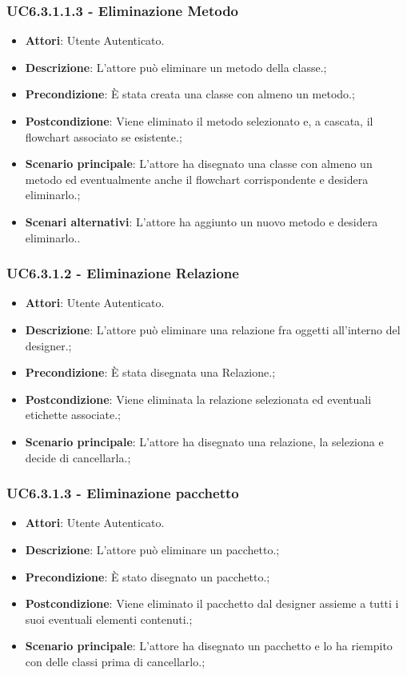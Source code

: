 \subsubsection{UC6.3.1.1.3 - Eliminazione Metodo} 
\label{sssec:UC6.3.1.1.3} 
\begin{itemize} 
\item \textbf{Attori}: Utente Autenticato.
\item \textbf{Descrizione}: L'attore può eliminare un metodo della classe.;
\item \textbf{Precondizione}: È stata creata una classe con almeno un metodo.;
\item \textbf{Postcondizione}: Viene eliminato il metodo selezionato e, a cascata, il flowchart associato se esistente.;
\item \textbf{Scenario principale}: L'attore ha disegnato una classe con almeno un metodo ed  eventualmente anche il flowchart corrispondente e desidera eliminarlo.;\item \textbf{Scenari alternativi}: L'attore ha aggiunto un nuovo metodo e desidera eliminarlo..
\end{itemize} 
\subsubsection{UC6.3.1.2 - Eliminazione Relazione} 
\label{sssec:UC6.3.1.2} 
\begin{itemize} 
\item \textbf{Attori}: Utente Autenticato.
\item \textbf{Descrizione}: L'attore può eliminare una relazione fra oggetti all'interno del designer.;
\item \textbf{Precondizione}: È stata disegnata una Relazione.;
\item \textbf{Postcondizione}: Viene eliminata la relazione selezionata ed eventuali etichette associate.;
\item \textbf{Scenario principale}: L'attore ha disegnato una relazione, la seleziona e decide di cancellarla.;\end{itemize} 
\subsubsection{UC6.3.1.3 - Eliminazione pacchetto} 
\label{sssec:UC6.3.1.3} 
\begin{itemize} 
\item \textbf{Attori}: Utente Autenticato.
\item \textbf{Descrizione}: L'attore può eliminare un pacchetto.;
\item \textbf{Precondizione}: È stato disegnato un pacchetto.;
\item \textbf{Postcondizione}: Viene eliminato il pacchetto dal designer assieme a tutti i suoi eventuali elementi contenuti.;
\item \textbf{Scenario principale}: L'attore ha disegnato un pacchetto e lo ha riempito con delle classi prima di cancellarlo.;\end{itemize} 
